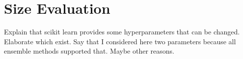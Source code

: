 \section{Size Evaluation}
\label{sec:eval_size}
Explain that scikit learn provides some hyperparameters that can be changed. Elaborate which exist.
Say that I considered here two parameters because all ensemble methods supported that. Maybe other reasons.


